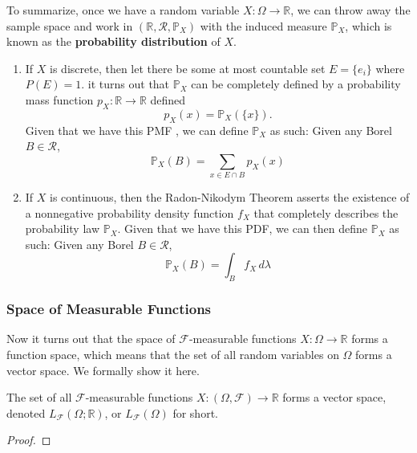     To summarize, once we have a random variable $X: \Omega \rightarrow \mathbb{R}$, we can throw away the sample space and work in $(\mathbb{R}, \mathcal{R}, \mathbb{P}_X)$ with the induced measure $\mathbb{P}_X$, which is known as the \textbf{probability distribution} of $X$.  
    \begin{enumerate}
      \item If $X$ is discrete, then let there be some at most countable set $E = \{e_i\}$ where $P(E) = 1$. it turns out that $\mathbb{P}_X$ can be completely defined by a probability mass function $p_X : \mathbb{R} \rightarrow \mathbb{R}$ defined 
      \begin{equation}
        p_X (x) = \mathbb{P}_X (\{x\}).
      \end{equation}
      Given that we have this PMF , we can define $\mathbb{P}_X$ as such: Given any Borel $B \in \mathcal{R}$, 
      \begin{equation}
        \mathbb{P}_X (B) = \sum_{x \in E \cap B} p_X (x)
      \end{equation}
      \item If $X$ is continuous, then the Radon-Nikodym Theorem asserts the existence of a nonnegative probability density function $f_X$ that completely describes the probability law $\mathbb{P}_X$. Given that we have this PDF, we can then define $\mathbb{P}_X$ as such: Given any Borel $B \in \mathcal{R}$, 
      \begin{equation}
        \mathbb{P}_X (B) = \int_B f_X \, d\lambda
      \end{equation}
    \end{enumerate}

  \subsubsection{Space of Measurable Functions}

    Now it turns out that the space of $\mathcal{F}$-measurable functions $X: \Omega \rightarrow \mathbb{R}$ forms a function space, which means that the set of all random variables on $\Omega$ forms a vector space. We formally show it here. 

    \begin{lemma}
      The set of all $\mathcal{F}$-measurable functions $X: (\Omega, \mathcal{F}) \rightarrow \mathbb{R}$ forms a vector space, denoted $L_\mathcal{F} (\Omega; \mathbb{R})$, or $L_\mathcal{F} (\Omega)$ for short. 
    \end{lemma}
    \begin{proof}

    \end{proof}

